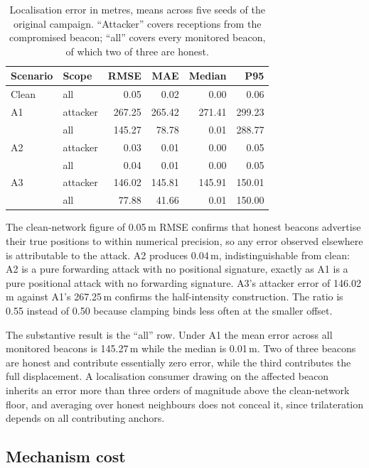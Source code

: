\begin{table}[!t]
\caption{Localisation error in metres, means across five seeds of the original
campaign. ``Attacker'' covers receptions from the compromised beacon; ``all''
covers every monitored beacon, of which two of three are honest.}
\label{tab:locerr}
\centering
\small
\begin{tabular}{@{}llrrrr@{}}
\toprule
Scenario & Scope & RMSE & MAE & Median & P95 \\
\midrule
Clean & all & 0.05 & 0.02 & 0.00 & 0.06 \\
A1 & attacker & 267.25 & 265.42 & 271.41 & 299.23 \\
   & all & 145.27 & 78.78 & 0.01 & 288.77 \\
A2 & attacker & 0.03 & 0.01 & 0.00 & 0.05 \\
   & all & 0.04 & 0.01 & 0.00 & 0.05 \\
A3 & attacker & 146.02 & 145.81 & 145.91 & 150.01 \\
   & all & 77.88 & 41.66 & 0.01 & 150.00 \\
\bottomrule
\end{tabular}
\end{table}

The clean-network figure of 0.05\,m RMSE confirms that honest beacons advertise
their true positions to within numerical precision, so any error observed
elsewhere is attributable to the attack. A2 produces 0.04\,m, indistinguishable
from clean: A2 is a pure forwarding attack with no positional signature, exactly
as A1 is a pure positional attack with no forwarding signature. A3's attacker
error of 146.02\,m against A1's 267.25\,m confirms the half-intensity
construction. The ratio is 0.55 instead of 0.50 because clamping binds less
often at the smaller offset.

The substantive result is the ``all'' row. Under A1 the mean error across all
monitored beacons is 145.27\,m while the median is 0.01\,m. Two of three beacons
are honest and contribute essentially zero error, while the third contributes
the full displacement. A localisation consumer drawing on the affected beacon
inherits an error more than three orders of magnitude above the clean-network floor, and
averaging over honest neighbours does not conceal it, since trilateration
depends on all contributing anchors.


\subsection{Mechanism cost}

